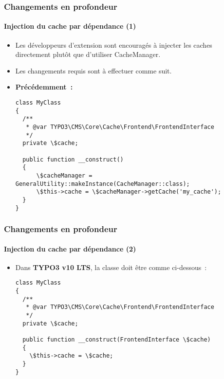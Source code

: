 
\begin{frame}[fragile]
	\frametitle{Changements en profondeur}
	\framesubtitle{Injection du cache par dépendance (1)}

	\lstset{basicstyle=\tiny\ttfamily}

	\begin{itemize}
		\item Les développeurs d'extension sont encouragés à injecter les caches directement plutôt
			que d'utiliser CacheManager.
		\item Les changements requis sont à effectuer comme suit.

		\item \textbf{Précédemment~:}
\begin{lstlisting}
class MyClass
{
  /**
   * @var TYPO3\CMS\Core\Cache\Frontend\FrontendInterface
   */
  private \$cache;

  public function __construct()
  {
      \$cacheManager = GeneralUtility::makeInstance(CacheManager::class);
      \$this->cache = \$cacheManager->getCache('my_cache');
  }
}
\end{lstlisting}

	\end{itemize}

\end{frame}


\begin{frame}[fragile]
	\frametitle{Changements en profondeur}
	\framesubtitle{Injection du cache par dépendance (2)}

	\lstset{basicstyle=\tiny\ttfamily}

	\begin{itemize}
		\item Dans \textbf{TYPO3 v10 LTS}, la classe doit être comme ci-dessous~:
\begin{lstlisting}
class MyClass
{
  /**
   * @var TYPO3\CMS\Core\Cache\Frontend\FrontendInterface
   */
  private \$cache;

  public function __construct(FrontendInterface \$cache)
  {
    \$this->cache = \$cache;
  }
}
\end{lstlisting}

	\end{itemize}

\end{frame}

